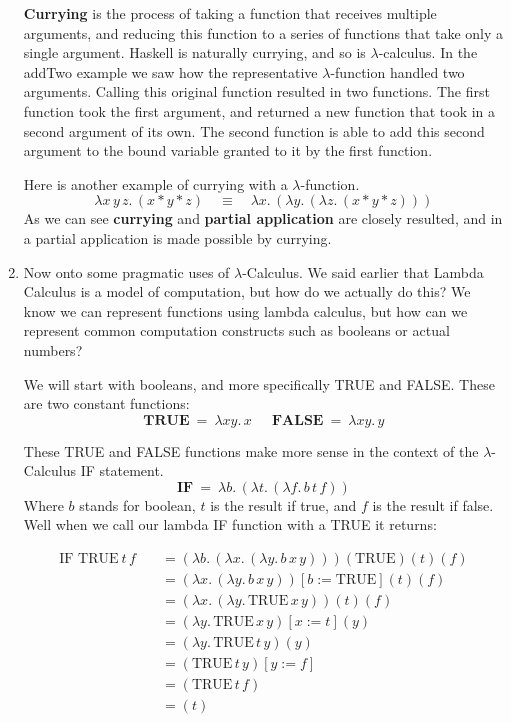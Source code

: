 \documentclass[12pt]{article}
\begin{document}
\begin{enumerate}
\textbf{Currying} is the process of taking a function that receives multiple arguments, and reducing this function to a series of functions that take only a single argument. Haskell is naturally currying, and so is $\lambda$-calculus. In the addTwo example we saw how the representative $\lambda$-function handled two arguments. Calling this original function resulted in two functions. The first function took the first argument, and returned a new function that took in a second argument of its own. The second function is able to add this second argument to the bound variable granted to it by the first function. \par Here is another example of currying with a $\lambda$-function.
$$\lambda x\,y\,z.\, (x * y * z) \quad \equiv \quad \lambda x.\,(\lambda y.\,(\lambda z.\, (x * y * z)))$$ 
As we can see \textbf{currying} and \textbf{partial application} are closely resulted, and in a partial application is made possible by currying.

\item Now onto some pragmatic uses of $\lambda$-Calculus. We said earlier that Lambda Calculus is a model of computation, but how do we actually do this? We know we can represent functions using lambda calculus, but how can we represent common computation constructs such as booleans or actual numbers? 
\par We will start with booleans, and more specifically TRUE and FALSE. These are two constant functions:
$$\textbf{TRUE}\ =\  \lambda xy.\,x\ \quad \ \textbf{FALSE}\ =\  \lambda xy.\,y$$

These TRUE and FALSE functions make more sense in the context of the $\lambda$-Calculus IF statement.
$$\textbf{IF}\ =\ \lambda b.\,(\lambda t.\,(\lambda f.\, b\, t \,f))$$
Where $b$ stands for boolean, $t$ is the result if true, and $f$ is the result if false. Well when we call our lambda IF function with a TRUE it returns:

\begin{align*}
\text{IF TRUE}\  t\, f \quad &= (\lambda b.\,(\lambda x.\, (\lambda y.\, b\,x\,y)))(\text{TRUE})(t)(f)\\
&= (\lambda x.\, (\lambda y.\, b\,x\,y))[b := \text{TRUE}](t)(f)\\
&= (\lambda x.\, (\lambda y.\, \text{TRUE}\,x\,y))(t)(f)\\
&= (\lambda y.\, \text{TRUE}\,x\,y)[x:=t](y)\\
&= (\lambda y.\, \text{TRUE}\,t\,y)(y)\\
&= (\text{TRUE}\,t\,y)[y:=f] \\
&= (\text{TRUE}\,t\,f)\\
&= (t)
\end{align*}


\end{enumerate}
\end{document}
